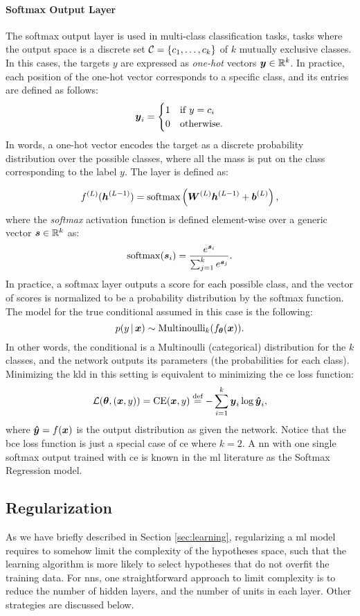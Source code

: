 \paragraph{Softmax Output Layer}
The softmax output layer is used in multi-class classification tasks, \ie tasks where the output space is a discrete set $\Cal{C} = \Set{c_1, \ldots, c_k}$ of $k$ mutually exclusive classes. In this cases, the targets $y$ are expressed as \emph{one-hot} vectors $\Vector{y} \in \Real^k$. In practice, each position of the one-hot vector corresponds to a specific class, and its entries are defined as follows:
\begin{align*}
    \Vector{y}_i=
    \begin{cases}
        1 & \mathrm{if}\; y = c_i\\
        0 & \mathrm{otherwise}.
    \end{cases}
\end{align*}
In words, a one-hot vector encodes the target as a discrete probability distribution over the possible classes, where all the mass is put on the class corresponding to the label $y$. The layer is defined as:

$$\Layer{f}{L}(\LayerVector{h}{L-1}) = \softmax \Par{\LayerMatrix{W}{L} \LayerVector{h}{L-1} + \LayerVector{b}{L}},$$
where the \emph{softmax} activation function is defined element-wise over a generic vector $\Vector{s} \in \Real^k$ as:
$$\softmax(\Vector{s}_i) = \frac{e^{\Vector{s}_i}}{\sum_{j=1}^k e^{\Vector{s}_j}}.$$
In practice, a softmax layer outputs a score for each possible class, and the vector of scores is normalized to be a probability distribution by the softmax function. The model for the true conditional assumed in this case is the following:
$$p(y \given \Vector{x}) \sim \Fun{Multinoulli}_k(f_{\Param}(\Vector{x})).$$
In other words, the conditional is a Multinoulli (categorical) distribution for the $k$ classes, and the network outputs its parameters (the probabilities for each class). Minimizing the \gls{kld} in this setting is equivalent to minimizing the \gls{ce} loss function:
$$\Loss(\Param, (\Vector{x}, y)) = \mathrm{CE}(\Vector{x}, y) \defeq - \sum_{i=1}^k \Vector{y}_i \log \Vector{\hat{y}}_i,$$
where $\Vector{\hat{y}} = f(\Vector{x})$ is the output distribution as given the network. Notice that the \gls{bce} loss function is just a special case of \gls{ce} where $k = 2$. A \gls{nn} with one single softmax output trained with \gls{ce} is known in the \gls{ml} literature as the Softmax Regression model.

\subsection{Regularization}\label{sec:regularization}
As we have briefly described in Section \ref{sec:learning}, regularizing a \gls{ml} model requires to somehow limit the complexity of the hypotheses space, such that the learning algorithm is more likely to select hypotheses that do not overfit the training data. For \glspl{nn}, one straightforward approach to limit complexity is to reduce the number of hidden layers, and the number of units in each layer. Other strategies are discussed below.

